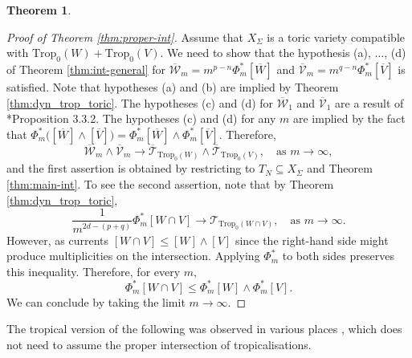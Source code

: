 \documentclass[11pt]{amsart}
\theoremstyle{definition}
\newtheorem{theorem}{Theorem}[section]
\newcommand{\lto}{\longrightarrow}
\newcommand{\C}{\mathbb{C}}
\newcommand{\sT}{\mathscr{T}}
\newcommand{\sW}{\mathscr{W}}
\newcommand{\sV}{\mathscr{V}}
\newcommand{\Trop}{\mathrm{Trop}}
\begin{document}
\begin{theorem}
\begin{proof}[Proof of Theorem \ref{thm:proper-int}]
    Assume that $X_{\Sigma}$ is a toric variety compatible with $\Trop_0(W)+ \Trop_0(V).$ We need to show that the hypothesis (a), $\dots$, (d) of Theorem \ref{thm:int-general} for $\overline{\sW}_m= {m^{p-n}}\Phi^*_m[\overline{W}]$ and $\overline{\sV}_m= {m^{q-n}}\Phi^*_m[\overline{V}]$ is satisfied. Note that hypotheses (a) and (b) are implied by Theorem \ref{thm:dyn_trop_toric}. The hypotheses (c) and (d) for $\overline{\sW}_1$ and $\overline{\sV}_1$ are a result of \cite{Osserman-Payne}*{Proposition 3.3.2}. The hypotheses (c) and (d) for any $m$ are implied by the fact that $\Phi_m^* \big([\overline{W}] \wedge [\overline{V}]\big) =\Phi_m^*[\overline{W}] \wedge \Phi_m^*[\overline{V}].$ Therefore, 
    $$
    \overline{\sW}_m \wedge \overline{\sV}_m \lto \overline{\sT}_{\Trop_{0}(W)} \wedge \overline{\sT}_{\Trop_{0}(V)}, \quad \text{as $m \to \infty,$}
    $$
    and the first assertion is obtained by restricting to $T_N \subseteq X_\Sigma$ and Theorem \ref{thm:main-int}. To see the second assertion, note that by Theorem \ref{thm:dyn_trop_toric},
    $$
    \frac{1}{m^{2d-(p+q)}}\Phi^*_{m} [W \cap V ]  \lto \sT_{\Trop_0(W\cap V)}, \quad \text{as $m \to \infty.$}
    $$
    However, as currents $[W \cap V] \leq [W] \wedge [V]$ since the right-hand side might produce multiplicities on the intersection. Applying $\Phi_m^*$ to both sides preserves this inequality.  Therefore, for every $m,$
    $$
    \Phi^*_{m} [W \cap V ]  \leq \Phi_m^*[W] \wedge \Phi_m^*[V]. 
    $$
   We can conclude by taking the limit $m \lto \infty.$

\end{proof}
\end{theorem}
The tropical version of the following was observed in various places \cite{Osserman-Payne, Maclagan-Sturmfels}, which does not need to assume the proper intersection of tropicalisations. 
  
\end{document}
